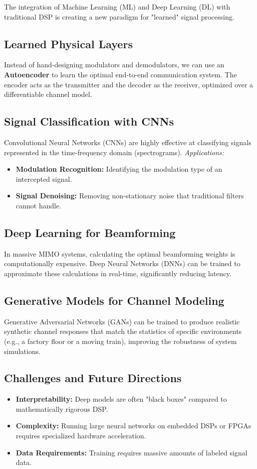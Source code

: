 
The integration of Machine Learning (ML) and Deep Learning (DL) with traditional DSP is creating a new paradigm for "learned" signal processing.

\subsection{Learned Physical Layers}
Instead of hand-designing modulators and demodulators, we can use an \textbf{Autoencoder} to learn the optimal end-to-end communication system. The encoder acts as the transmitter and the decoder as the receiver, optimized over a differentiable channel model.

\subsection{Signal Classification with CNNs}
Convolutional Neural Networks (CNNs) are highly effective at classifying signals represented in the time-frequency domain (spectrograms).
\textit{Applications:}
\begin{itemize}
    \item \textbf{Modulation Recognition:} Identifying the modulation type of an intercepted signal.
    \item \textbf{Signal Denoising:} Removing non-stationary noise that traditional filters cannot handle.
\end{itemize}

\subsection{Deep Learning for Beamforming}
In massive MIMO systems, calculating the optimal beamforming weights is computationally expensive. Deep Neural Networks (DNNs) can be trained to approximate these calculations in real-time, significantly reducing latency.

\subsection{Generative Models for Channel Modeling}
Generative Adversarial Networks (GANs) can be trained to produce realistic synthetic channel responses that match the statistics of specific environments (e.g., a factory floor or a moving train), improving the robustness of system simulations.

\subsection{Challenges and Future Directions}
\begin{itemize}
    \item \textbf{Interpretability:} Deep models are often "black boxes" compared to mathematically rigorous DSP.
    \item \textbf{Complexity:} Running large neural networks on embedded DSPs or FPGAs requires specialized hardware acceleration.
    \item \textbf{Data Requirements:} Training requires massive amounts of labeled signal data.
\end{itemize}

